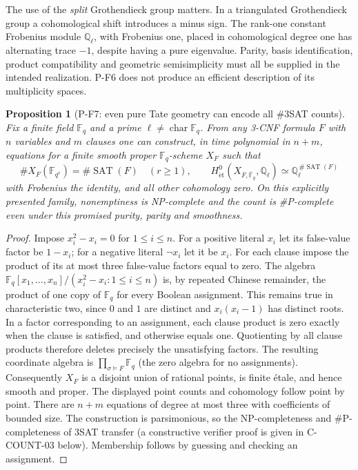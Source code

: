 \documentclass[11pt,a4paper]{article}
\newtheorem{proposition}{Proposition}[section]
\begin{document}
The use of the \emph{split} Grothendieck group matters. In a triangulated
Grothendieck group a cohomological shift introduces a minus sign.
The rank-one constant Frobenius module $\mathbb Q_\ell$, with Frobenius
one, placed in cohomological degree one has alternating trace $-1$,
despite having a pure eigenvalue. Parity, basis identification, product
compatibility and geometric semisimplicity must all be supplied in the
intended realization. P-F6 does not produce an efficient description of
its multiplicity spaces.

\begin{proposition}[P-F7: even pure Tate geometry can encode all \#3SAT counts]
\label{prop:tatesat}
Fix a finite field $\mathbb F_q$ and a prime $\ell\ne\operatorname{char}\mathbb F_q$.
From any 3-CNF formula $F$ with $n$
variables and $m$ clauses one can construct, in time polynomial in
$n+m$, equations for a finite smooth proper $\mathbb F_q$-scheme $X_F$
such that
\[
 \#X_F(\mathbb F_{q^r})=\#\operatorname{SAT}(F)\quad(r\ge1),\qquad
 H^0_{\mathrm{\acute et}}(X_{F,\overline{\mathbb F}_q},\mathbb Q_\ell)
 \simeq \mathbb Q_\ell^{\,\#\operatorname{SAT}(F)}
\]
with Frobenius the identity, and all other cohomology zero.
On this explicitly presented family, nonemptiness is NP-complete and
the count is \#P-complete even under this promised purity, parity and
smoothness.
\end{proposition}
\begin{proof}
Impose $x_i^2-x_i=0$ for $1\le i\le n$.
For a positive literal $x_i$ let its false-value factor be $1-x_i$;
for a negative literal $\neg x_i$ let it be $x_i$.
For each clause impose the product of its at most three false-value
factors equal to zero.
The algebra
$\mathbb F_q[x_1,\ldots,x_n]/(x_i^2-x_i:1\le i\le n)$
is, by repeated Chinese remainder, the product of one copy of
$\mathbb F_q$ for every Boolean assignment. This remains true in
characteristic two, since $0$ and $1$ are distinct and
$x_i(x_i-1)$ has distinct roots.
In a factor corresponding to an assignment, each clause product is
zero exactly when the clause is satisfied, and otherwise equals one.
Quotienting by all clause products therefore deletes precisely the
unsatisfying factors. The resulting coordinate algebra is
$\prod_{\sigma\models F}\mathbb F_q$ (the zero algebra for no assignments).
Consequently $X_F$ is a disjoint union of rational points, is finite
\'etale, and hence smooth and proper. The displayed point counts and
cohomology follow point by point.
There are $n+m$ equations of degree at most three with coefficients of
bounded size. The construction is parsimonious, so the
NP-completeness and \#P-completeness of 3SAT transfer (a constructive
verifier proof is given in C-COUNT-03 below). Membership follows
by guessing and checking an assignment.
\end{proof}
\end{document}
